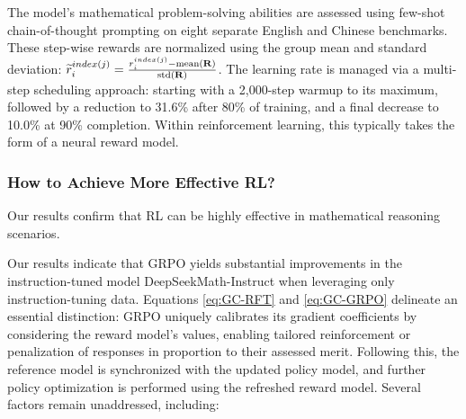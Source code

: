 The model’s mathematical problem-solving abilities are assessed using few-shot chain-of-thought prompting \citep{cot} on eight separate English and Chinese benchmarks. These step-wise rewards are normalized using the group mean and standard deviation: $\widetilde{r}_i^{index(j)} = \frac{r_i^{index(j)} - {\rm mean(\mathbf{R})}}{{\rm std(\mathbf{R})}}$. The learning rate is managed via a multi-step scheduling approach: starting with a 2,000-step warmup to its maximum, followed by a reduction to 31.6\% after 80\% of training, and a final decrease to 10.0\% at 90\% completion. Within reinforcement learning, this typically takes the form of a neural reward model. \subsubsection{How to Achieve More Effective RL?}
\label{sec:effec_rl}
Our results confirm that RL can be highly effective in mathematical reasoning scenarios. \item Our results indicate that GRPO yields substantial improvements in the instruction-tuned model DeepSeekMath-Instruct when leveraging only instruction-tuning data. Equations \ref{eq:GC-RFT} and \ref{eq:GC-GRPO} delineate an essential distinction: GRPO uniquely calibrates its gradient coefficients by considering the reward model’s values, enabling tailored reinforcement or penalization of responses in proportion to their assessed merit. Following this, the reference model is synchronized with the updated policy model, and further policy optimization is performed using the refreshed reward model. Several factors remain unaddressed, including:

